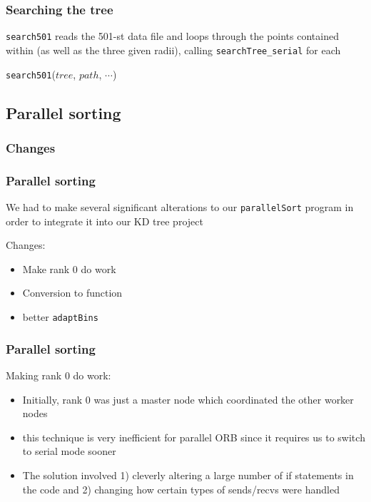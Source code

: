 \documentclass{beamer}
\begin{document}
\begin{frame}
	\frametitle{Searching the tree}
	
	\texttt{search501} reads the 501-st data file and loops through the points contained within (as well as the three given radii), calling \texttt{searchTree\_serial} for each
	
	\vspace{10pt}
	
	\begin{algorithm}[H]
		\begin{algorithmic}[1]
			\STATE 
		\end{algorithmic}
		\caption{\texttt{search501}($tree$, $path$, $\cdots$)}
	\end{algorithm}
		
\end{frame}


\subsection{Parallel sorting}


\subsubsection{Changes}

\begin{frame}
	\frametitle{Parallel sorting}
	
	We had to make several significant alterations to our \texttt{parallelSort} program in order to integrate it into our KD tree project
	
	\vspace{10pt}
	
	\begin{block}{Changes:}
		\begin{itemize}
			\item Make rank 0 do work
			\item Conversion to function
			\item better \texttt{adaptBins}
		\end{itemize}
	\end{block}
\end{frame}

\begin{frame}
	\frametitle{Parallel sorting}
	
	\begin{block}{Making rank 0 do work:}
		\begin{itemize}
			\item Initially, rank 0 was just a master node which coordinated the other worker nodes
			\item this technique is very inefficient for parallel ORB since it requires us to switch to serial mode sooner
			\item The solution involved 1) cleverly altering a large number of if statements in the code and 2) changing how certain types of sends/recvs were handled
		\end{itemize}
	\end{block}
\end{frame}
\end{document}
